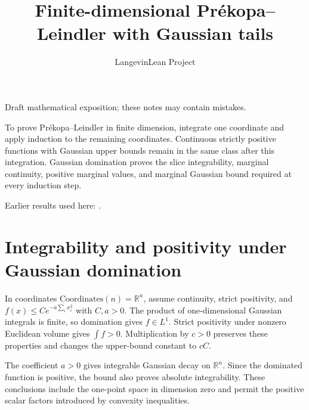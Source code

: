 \documentclass[11pt,a4paper]{article}
\title{\texorpdfstring{Finite-dimensional Prékopa–Leindler with Gaussian tails}{Finite-dimensional Prékopa–Leindler with Gaussian tails}}
\author{LangevinLean Project}
\date{}
\begin{document}
\maketitle
Draft mathematical exposition; these notes may contain mistakes.


To prove Prékopa–Leindler in finite dimension, integrate one coordinate and apply induction to the remaining coordinates. Continuous strictly positive functions with Gaussian upper bounds remain in the same class after this integration. Gaussian domination proves the slice integrability, marginal continuity, positive marginal values, and marginal Gaussian bound required at every induction step.



Earlier results used here: \cite[Section~3.26]{LangevinLean2026ULASC}.

\section{\texorpdfstring{Integrability and positivity under Gaussian domination}{Integrability and positivity under Gaussian domination}}


In coordinates \(\mathrm{Coordinates}(n)=\mathbb R^n\), assume continuity, strict positivity, and \(f(x)\le Ce^{-a\sum_i x_i^2}\) with \(C,a>0\). The product of one-dimensional Gaussian integrals is finite, so domination gives \(f\in L^1\). Strict positivity under nonzero Euclidean volume gives \(\int f>0\). Multiplication by \(c>0\) preserves these properties and changes the upper-bound constant to \(cC\).



The coefficient \(a>0\) gives integrable Gaussian decay on \(\mathbb R^n\). Since the dominated function is positive, the bound also proves absolute integrability. These conclusions include the one-point space in dimension zero and permit the positive scalar factors introduced by convexity inequalities.
\end{document}
